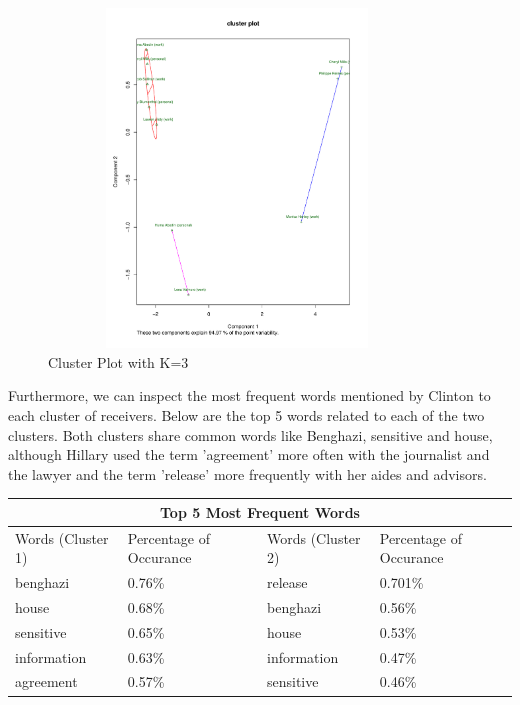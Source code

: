 \begin{figure}[h!]
    \centering
    \includegraphics[width=10cm,height=9cm]
    {daitong_and_yihe/c3.pdf}
    \caption{Cluster Plot with K=3}
\end{figure}

\newpage
Furthermore, we can inspect the most frequent words mentioned by Clinton to each cluster of receivers. Below are the top 5 words related to each of the two clusters. Both clusters share common words like Benghazi, sensitive and house, although Hillary used the term 'agreement' more often with the journalist and the lawyer and the term 'release' more frequently with her aides and advisors. 

\begin{center}
\begin{tabular}{ |p{3cm}|p{3cm}|| p{3cm}|p{3cm}|  }
 \hline
 \multicolumn{4}{|c|}{Top 5 Most Frequent Words} \\
 \hline
 Words (Cluster 1)  & Percentage of Occurance & Words (Cluster 2) & Percentage of Occurance\\
 \hline
 benghazi & 0.76\% & release  & 0.701\% \\
 house &  0.68\% & benghazi & 0.56\% \\
 sensitive & 0.65\% & house & 0.53\%\\
 information & 0.63\% & information & 0.47\%\\
 agreement & 0.57\% &  sensitive  & 0.46\% \\
 \hline
\end{tabular}
\end{center}

